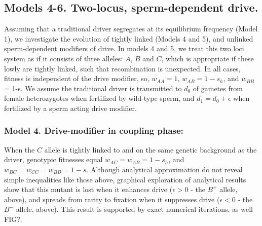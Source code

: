 \documentclass[12pt,letterpaper]{article}
\newcommand{\yb}[1]{{ \color{blue} #1}}
\begin{document}
\subsection*{Models 4-6. Two-locus, sperm-dependent drive.} 
Assuming that a traditional driver segregates at its equilibrium frequency (Model 1), we investigate the evolution of tightly linked (Models 4 and 5), and unlinked sperm-dependent modifiers of drive. 
In models 4 and 5, we treat this two loci system as if it consists of three alleles: $A$, $B$ and $C$, which is appropriate if these lowly are tightly linked, such that recombination is unexpected. 
In all cases, fitness is independent of the drive modifier, so, $w_{AA}=1$, $w_{AB}=1-s_h$, and $w_{BB}$ = 1-s. 
We assume the traditional driver is transmitted to $d_0$ of gametes from female heterozygotes  when fertilized by wild-type sperm, and $d_1=d_0+\epsilon$ when fertilized by a sperm acting drive modifier.

\subsubsection*{Model 4. Drive-modifier in coupling phase:}
When the $C$ allele is tightly linked to and on the same genetic background as the driver, 
	genotypic fitnesses equal $w_{AC}=w_{AB}=1-s_h$, and $w_{BC}=w_{CC}=w_{BB}=1-s$. 
Although analytical approximation do not reveal simple inequalities like those above,
	graphical exploration of analytical results show that this mutant is lost when it enhances drive ($\epsilon>0$ - the $B^+$ allele, above),
	and spreads from rarity to fixation when it suppresses drive ($\epsilon<0$ - the $B^-$ allele, above).	
This result is supported by exact numerical iterations, as well \yb{FIG?}. 
\end{document}
